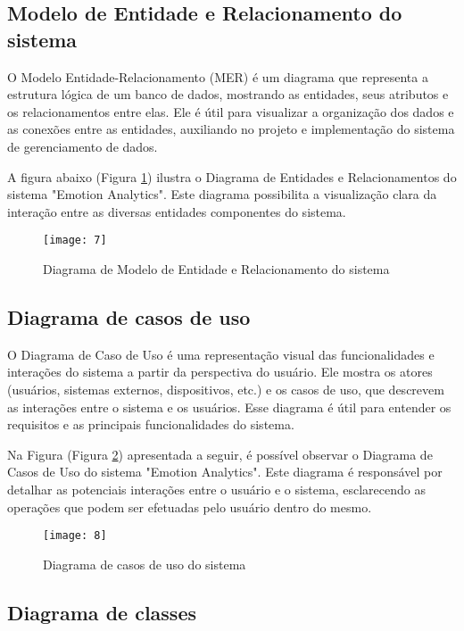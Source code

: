 \subsection{Modelo de Entidade e Relacionamento do sistema}

O Modelo Entidade-Relacionamento (MER) \cite{26} é um diagrama que representa a estrutura lógica de um banco de dados, mostrando as entidades, seus atributos e os relacionamentos entre elas. Ele é útil para visualizar a organização dos dados e as conexões entre as entidades, auxiliando no projeto e implementação do sistema de gerenciamento de dados.

A figura abaixo (Figura \ref{fig:7}) ilustra o Diagrama de Entidades e Relacionamentos do sistema "Emotion Analytics". Este diagrama possibilita a visualização clara da interação entre as diversas entidades componentes do sistema.

\begin{figure}[h]
  \caption{Diagrama de Modelo de Entidade e Relacionamento do sistema}
  \centering
  \texttt{[image: 7]}
  \label{fig:7}
\end{figure}
\FloatBarrier

\clearpage
\subsection{Diagrama de casos de uso}

O Diagrama de Caso de Uso \cite{27} é uma representação visual das funcionalidades e interações do sistema a partir da perspectiva do usuário. Ele mostra os atores (usuários, sistemas externos, dispositivos, etc.) e os casos de uso, que descrevem as interações entre o sistema e os usuários. Esse diagrama é útil para entender os requisitos e as principais funcionalidades do sistema.

Na Figura (Figura \ref{fig:8}) apresentada a seguir, é possível observar o Diagrama de Casos de Uso do sistema "Emotion Analytics". Este diagrama é responsável por detalhar as potenciais interações entre o usuário e o sistema, esclarecendo as operações que podem ser efetuadas pelo usuário dentro do mesmo.

\begin{figure}[h]
  \caption{Diagrama de casos de uso do sistema}
  \centering
  \texttt{[image: 8]}
  \label{fig:8}
\end{figure}
\FloatBarrier

\clearpage
\subsection{Diagrama de classes}


